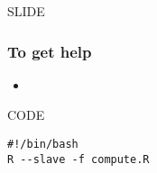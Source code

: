SLIDE
\begin{frame}
\frametitle{To get help}
\begin{itemize}
\item 

\end{itemize}
\end{frame}

CODE
\begin{block}{}
\begin{verbatim}
#!/bin/bash
R --slave -f compute.R
\end{verbatim}
\end{block}
